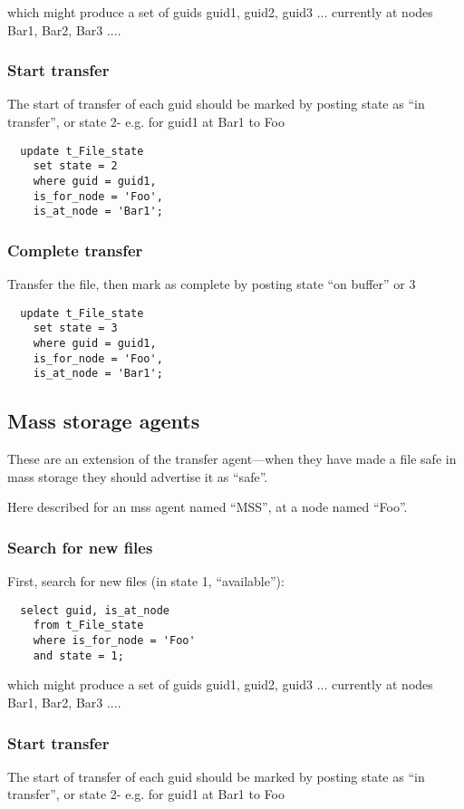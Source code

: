 \documentclass{cmspaper}
\begin{document}
which might produce a set of guids {guid1, guid2, guid3 ...} currently at nodes {Bar1, Bar2, Bar3 ...}. 

\subsubsection{Start transfer}
The start of transfer of each guid should be marked by posting state as ``in transfer'', or state 2- e.g. for guid1 at Bar1 to Foo

{\small\begin{verbatim}
  update t_File_state
    set state = 2
    where guid = guid1,
    is_for_node = 'Foo',
    is_at_node = 'Bar1';
  \end{verbatim}}

\subsubsection{Complete transfer}
Transfer the file, then mark as complete by posting state ``on buffer'' or 3

{\small\begin{verbatim}
  update t_File_state
    set state = 3
    where guid = guid1,
    is_for_node = 'Foo',
    is_at_node = 'Bar1';
\end{verbatim}}

\subsection{Mass storage agents}
These are an extension of the transfer agent---when they have made a
file safe in mass storage they should advertise it as ``safe''.

Here described for an mss agent named ``MSS'', at a node named ``Foo''.

\subsubsection{Search for new files}
First, search for new files (in state 1, ``available''):

{\small\begin{verbatim}
  select guid, is_at_node
    from t_File_state
    where is_for_node = 'Foo'
    and state = 1;
\end{verbatim}}

which might produce a set of guids {guid1, guid2, guid3 ...} currently at nodes {Bar1, Bar2, Bar3 ...}. 

\subsubsection{Start transfer}
The start of transfer of each guid should be marked by posting state as ``in transfer'', or state 2- e.g. for guid1 at Bar1 to Foo
\end{document}
